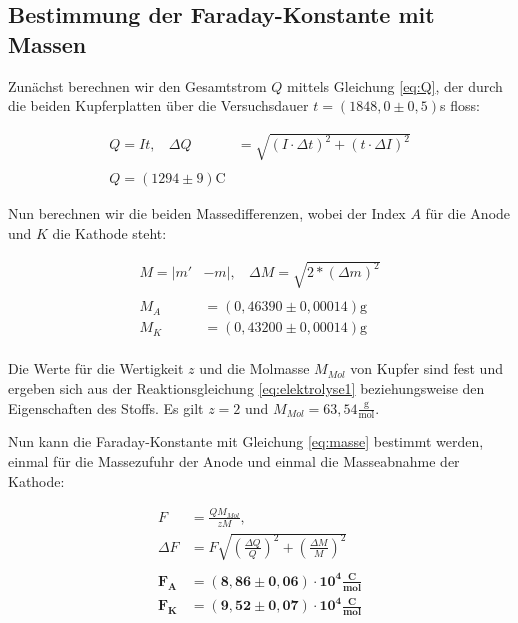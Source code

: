 \documentclass{article}
\begin{document}
\subsection{Bestimmung der Faraday-Konstante mit Massen}

Zunächst berechnen wir den Gesamtstrom $Q$ mittels Gleichung \ref{eq:Q}, der durch die beiden Kupferplatten über die Versuchsdauer $t=(1848,0\pm0,5)$s floss:

\begin{equation}
    \begin{split}
        Q = It, \ \ \ \ \Delta Q &= \sqrt{\left( I \cdot \Delta t \right)^2 + \left( t \cdot \Delta I \right)^2} \\ \\
        Q = (1294 \pm 9) \text{C}
    \end{split}
    \label{res:Q}
\end{equation}

Nun berechnen wir die beiden Massedifferenzen, wobei der Index $A$ für die Anode und $K$ die Kathode steht:

\begin{equation}
    \begin{split}
        M = |m' & - m|, \ \ \ \ \Delta M = \sqrt{2*(\Delta m)^2} \\ \\
        M_A &= (0,46390 \pm 0,00014) \text{g} \\
        M_K &= (0,43200 \pm 0,00014) \text{g} \\ %
    \end{split}
    \label{res:masses}
\end{equation}

Die Werte für die Wertigkeit $z$ und die Molmasse $M_{Mol}$ von Kupfer sind fest und ergeben sich aus der Reaktionsgleichung \ref{eq:elektrolyse1} beziehungsweise den Eigenschaften des Stoffs. Es gilt $z = 2$ und $M_{Mol} = 63,54 \frac{\text{g}}{\text{mol}}$. 

Nun kann die Faraday-Konstante mit Gleichung \ref{eq:masse} bestimmt werden, einmal für die Massezufuhr der Anode und einmal die Masseabnahme der Kathode:

\begin{equation}
    \begin{split}
        F &= \frac{QM_{Mol}}{zM}, \\
        \Delta F &= F \sqrt{\left( \frac{\Delta Q}{Q} \right)^2 + \left( \frac{\Delta M}{M} \right)^2} \\ \\
        \bm{F_A} &= \bm{(8,86\pm 0,06) \cdot 10^{4} \frac{\textbf{C}}{\textbf{mol}}} \\
        \bm{F_K} &= \bm{(9,52 \pm 0,07) \cdot 10^{4} \frac{\textbf{C}}{\textbf{mol}}} \\
    \end{split}
    \label{res:Fm}
\end{equation}
\end{document}
